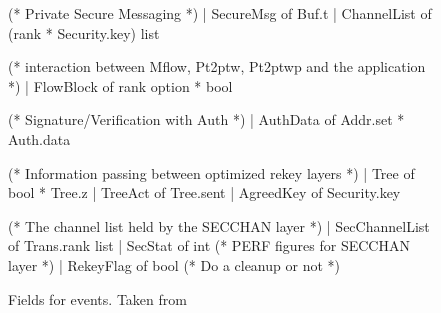 \begin{figure}
\begin{codebox}
      (* Private Secure Messaging *)
  | SecureMsg of Buf.t
  | ChannelList of (rank * Security.key) list
	
      (* interaction between Mflow, Pt2ptw, Pt2ptwp and the application *)
  | FlowBlock of rank option * bool

      (* Signature/Verification with Auth *)
  | AuthData of Addr.set * Auth.data

      (* Information passing between optimized rekey layers *)
  | Tree    of bool * Tree.z
  | TreeAct of Tree.sent
  | AgreedKey of Security.key

      (* The channel list held by the SECCHAN layer *)
  | SecChannelList of Trans.rank list
  | SecStat of int              (* PERF figures for SECCHAN layer *)
  | RekeyFlag of bool           (* Do a cleanup or not *)
\end{codebox}
\caption{Fields for events.  Taken from }
\label{fig:extensions}
\end{figure}

